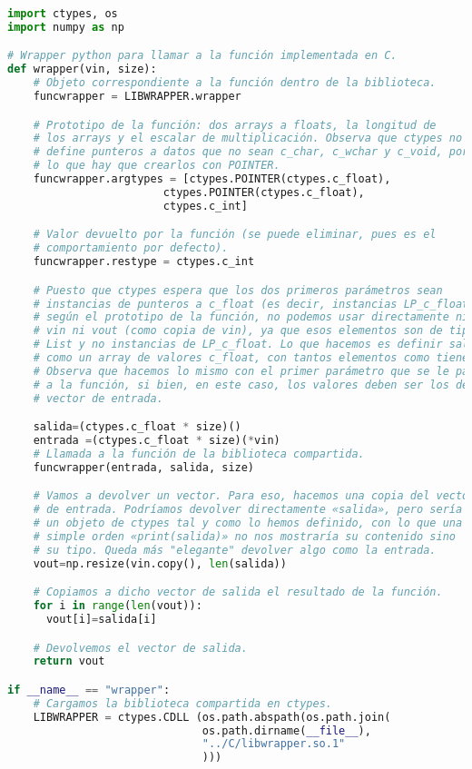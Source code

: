 \documentclass[10pt,journal,compsoc]{IEEEtran}
\begin{document}
\begin{lstlisting}[basicstyle=\tiny,language=Python]
import ctypes, os
import numpy as np

# Wrapper python para llamar a la función implementada en C.
def wrapper(vin, size):
    # Objeto correspondiente a la función dentro de la biblioteca.
    funcwrapper = LIBWRAPPER.wrapper

    # Prototipo de la función: dos arrays a floats, la longitud de 
    # los arrays y el escalar de multiplicación. Observa que ctypes no 
    # define punteros a datos que no sean c_char, c_wchar y c_void, por
    # lo que hay que crearlos con POINTER. 
    funcwrapper.argtypes = [ctypes.POINTER(ctypes.c_float),
    		            ctypes.POINTER(ctypes.c_float), 
    		            ctypes.c_int]

    # Valor devuelto por la función (se puede eliminar, pues es el
    # comportamiento por defecto).
    funcwrapper.restype = ctypes.c_int

    # Puesto que ctypes espera que los dos primeros parámetros sean
    # instancias de punteros a c_float (es decir, instancias LP_c_float),
    # según el prototipo de la función, no podemos usar directamente ni
    # vin ni vout (como copia de vin), ya que esos elementos son de tipo
    # List y no instancias de LP_c_float. Lo que hacemos es definir salida
    # como un array de valores c_float, con tantos elementos como tiene vin.
    # Observa que hacemos lo mismo con el primer parámetro que se le pasa 
    # a la función, si bien, en este caso, los valores deben ser los del 
    # vector de entrada.

    salida=(ctypes.c_float * size)()
    entrada =(ctypes.c_float * size)(*vin)
    # Llamada a la función de la biblioteca compartida.
    funcwrapper(entrada, salida, size)

    # Vamos a devolver un vector. Para eso, hacemos una copia del vector
    # de entrada. Podríamos devolver directamente «salida», pero sería
    # un objeto de ctypes tal y como lo hemos definido, con lo que una
    # simple orden «print(salida)» no nos mostraría su contenido sino 
    # su tipo. Queda más "elegante" devolver algo como la entrada.
    vout=np.resize(vin.copy(), len(salida))

    # Copiamos a dicho vector de salida el resultado de la función.
    for i in range(len(vout)):
      vout[i]=salida[i]

    # Devolvemos el vector de salida.
    return vout

if __name__ == "wrapper":
    # Cargamos la biblioteca compartida en ctypes.
    LIBWRAPPER = ctypes.CDLL (os.path.abspath(os.path.join(
    						  os.path.dirname(__file__),
    						  "../C/libwrapper.so.1"
    						  )))

\end{lstlisting}
\end{document}
